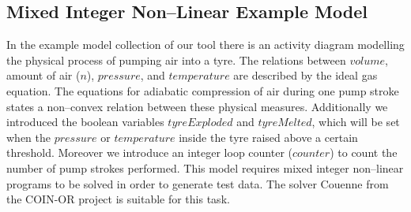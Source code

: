 \documentclass[runningheads,a4paper]{llncs}%
\begin{document}
\subsection{Mixed Integer Non--Linear Example Model}
\label{sec:exampleModelNonConvex}
In the example model collection of our tool there is an activity diagram modelling the physical process of pumping air into a tyre. The relations between $volume$, amount of air ($n$), $pressure$, and $temperature$ are described by the ideal gas equation. The equations for adiabatic compression of air during one pump stroke states a non--convex relation between these physical measures. Additionally we introduced the boolean variables $tyreExploded$ and $tyreMelted$, which will be set when the $pressure$ or $temperature$ inside the tyre raised above a certain threshold. Moreover we introduce an integer loop counter ($counter$) to count the number of pump strokes performed. This model requires mixed integer non--linear programs to be solved in order to generate test data. The solver Couenne \cite{Belotti09couenne} from the COIN-OR project is suitable for this task.%
\end{document}
